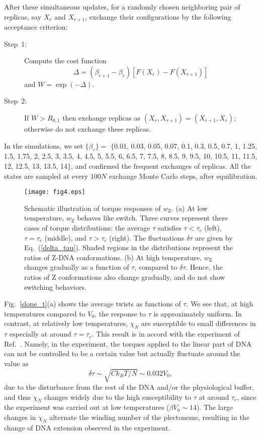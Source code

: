 \documentclass[pre,showpacs,twocolumn,superscriptaddress]{revtex4}
\begin{document}
After these simultaneous updates,
for a randomly chosen neighboring pair of replicas, say  $X_r$ and $X_{r+1}$, 
exchange their configurations 
by the following acceptance criterion:
\begin{description}
\item[Step~1:]
Compute the cost function 
\begin{equation*}
\Delta =(\beta_{r+1}-\beta_{r})[F(X_r)-F(X_{r+1})]
\end{equation*}
and 
$W=\exp(-\Delta)$.
\item[Step~2:]
If $W>R_{0,1}$ then
exchange replicas as
$(X_r,X_{r+1}) =(X_{r+1},X_r)$; otherwise do not exchange these replicas. 
\end{description}
In the simulations,
we set
$\{\beta_r\}=$
$\{$0.01, 0.03, 0.05, 0.07, 0.1, 0.3, 0.5, 0.7, 1, 1.25, 1.5, 1.75, 2, 
2.5, 3, 3.5, 4, 4.5, 5, 5.5, 6, 6.5, 7, 7.5, 8, 8.5, 9, 9.5, 10, 
10.5, 11, 11.5, 12, 12.5, 13, 13.5, 14$\}$,
and 
confirmed the frequent exchanges of replicas.
All the states are sampled at every $100N$ exchange Monte Carlo  steps,
after equilibration.
\begin{figure}[t]
\begin{center}
\texttt{[image: fig4.eps]}
\end{center}
\caption{
Schematic illustration of 
torque responses of $w_\text{Z}$.
(a) At low temperature,
$w_\text{Z}$ behaves like switch.
Three curves represent there cases of torque  distributions:
the average $\tau$ satisfies
$\tau<\tau_c$
(left),
$ \tau=\tau_c$
(middle),
and 
$ \tau >\tau_c$
(right).
The fluctuations $\delta \tau$ are given by Eq.~(\ref{delta_tau}).
Shaded regions in the distributions
represent the ratios of Z-DNA conformations.
(b)
At high temperature,
$w_\text{Z}$ changes gradually as a function of $\tau$,
compared to $\delta \tau$.
Hence,
the ratios of Z conformations also change gradually,
and do not show  switching behaviors.
}
\label{manga2}
\end{figure}

Fig.~\ref{slope_t}(a)
shows the average twists as functions of $\tau$.
We see that,
at high temperatures compared to $V_0$,
the response to $\tau$
is  approximately uniform.
In contrast, at relatively low temperatures,
$\chi_N$ are susceptible to small differences in $\tau$
especially at around $\tau=\tau_c$.
This result is in accord with the experiment of Ref.~\cite{BZtrans}.
Namely,
in the experiment,
the torques applied to the linear part of DNA
can not be controlled to be a certain value
but actually fluctuate around the value as
\begin{equation}
\delta \tau\sim \sqrt{C k_B T/N} \sim 0.032 V_0,
\label{delta_tau}
\end{equation}
due to
the disturbance from
the rest of the DNA and/or
the physiological buffer,
and thus
$\chi_N$ changes widely
due to the high susceptibility to $\tau$ at around $\tau_c$,
since the experiment was carried out at low temperatures ($\beta V_0 \sim 14$).
The large changes in $\chi_N$ alternate
the winding number of the plectoneme,
resulting in the change of DNA extension observed in the experiment. 
\end{document}
